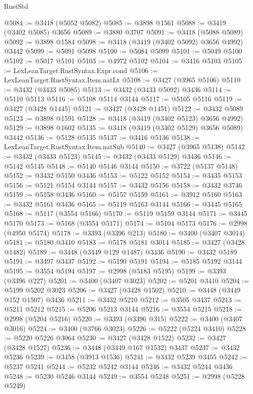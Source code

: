 \begin{lexlean}{RustStd}
\begin{coremodule}
@5084 := @3418 (@5052 @5082)
@5085 := @3898 @1561
@5088 := @3419 (@3402 @5085) @3656
@5089 := @3880 @3707
@5091 := @3418 (@5088 @5089)
@5092 := @3898 @1584
@5098 := @3418 (@3419 (@3402 @5092) @3656 @4992) @3442
@5099 := @5091 @5098
@5100 := @5084 @5099
@5101 := @5049 @5100
@5102 := @5017 @5101
@5103 := @4972 @5102
@5104 := @3416 @5103
@5105 := LexLeanTarget.RustSyntax.Expr.cond
@5106 := LexLeanTarget.RustSyntax.Item.natLt
@5108 := @3427 (@3965 @5106)
@5110 := @3432 (@3433 @5085)
@5113 := @3432 (@3433 @5092) @3436
@5114 := @5110 @5113
@5116 := @5108 @5114 @3144
@5117 := @5105 @5116
@5119 := @3427 (@3428 @1445)
@5121 := @3427 (@3428 @1451)
@5122 := @3432 @5089
@5123 := @3898 @1591
@5128 := @3418 (@3419 (@3402 @5123) @3656 @4992)
@5129 := @3898 @1602
@5135 := @3418 (@3419 (@3402 @5129) @3656 @5089) @3442
@5136 := @5128 @5135
@5137 := @3416 @5136
@5138 := LexLeanTarget.RustSyntax.Item.natSub
@5140 := @3427 (@3965 @5138)
@5142 := @3432 (@3433 @5123)
@5145 := @3432 (@3433 @5129) @3436
@5146 := @5142 @5145
@5148 := @5140 @5146 @3144
@5150 := @3722 (@5137 @5148)
@5152 := @3432 @5150 @3436
@5153 := @5122 @5152
@5154 := @3435 @5153
@5156 := @5121 @5154 @3144
@5157 := @3432 @5156
@5158 := @3432 @3746
@5159 := @5158 @3436
@5160 := @5157 @5159
@5161 := @3912 @5160
@5163 := @3432 @5161 @3436
@5165 := @5119 @5163 @3144
@5166 := @3445 @5165
@5168 := @5117 (@3554 @5166)
@5170 := @5119 @5159 @3144
@5171 := @3445 @5170
@5173 := @5168 (@3554 @5171)
@5174 := @5104 @5173
@5176 := @2998 (@4950 @5174)
@5178 := @3393 (@3396 @213)
@5180 := @3400 (@3407 @3014)
@5181 := @5180 @3410
@5183 := @5178 @5181 @3014
@5185 := @3427 (@3428 @1482)
@5189 := @3448 (@3449 @129 @1487) @3436
@5190 := @3432 @5189
@5191 := @3497 @3437
@5192 := @5190 @5191
@5194 := @5185 @5192 @3144
@5195 := @3554 @5194
@5197 := @2998 (@5183 @5195)
@5199 := @3393 (@3396 @227)
@5201 := @3400 (@3407 @3023)
@5202 := @5201 @3410
@5204 := @5199 @5202 @3023
@5206 := @3427 (@3428 @1502)
@5210 := @3448 (@3449 @152 @1507) @3436
@5211 := @3432 @5210
@5212 := @3505 @3437
@5213 := @5211 @5212
@5215 := @5206 @5213 @3144
@5216 := @3554 @5215
@5218 := @2998 (@5204 @5216)
@5220 := @3393 (@3396 @315)
@5222 := @3400 (@3407 @3016)
@5224 := @3400 (@3766 @3023)
@5226 := @5222 (@5224 @3410)
@5228 := @5220 @5226 @3064
@5230 := @3427 (@3428 @1522)
@5232 := @3427 (@3428 @1527)
@5236 := @3448 (@3449 @167 @1532) @3437
@5237 := @3432 @5236
@5239 := @3458 (@3913 @1536)
@5241 := @3432 @5239 @3455
@5242 := @5237 @5241
@5244 := @5232 @5242 @3144
@5246 := @3432 @5244 @3436
@5248 := @5230 @5246 @3144
@5249 := @3554 @5248
@5251 := @2998 (@5228 @5249)

\end{coremodule}
\end{lexlean}
